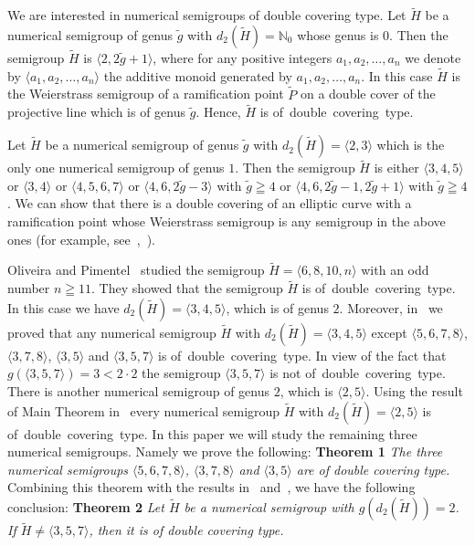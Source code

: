 \documentclass[a4paper,12pt]{article}
\newcommand{\tH}{\tilde{H}}
\newcommand{\tP}{\tilde{P}}
\newcommand{\tg}{\tilde{g}}
\newcommand{\la}{\langle}
\newcommand{\ra}{\rangle}
\newcommand{\NI}{\mathbb{N}_0}
\newcommand{\DC}{\mbox{of double covering type}}
\begin{document}
We are interested in numerical semigroups of double covering type.
Let $\tH$ be a numerical semigroup of genus $\tg$ with $d_2(\tH)=\NI$ whose genus is $0$.
Then the semigroup $\tH$ is  $\la 2,2\tg+1\ra$, where for any positive integers $a_{1},a_{2},\ldots,a_{n}$ we denote by $\langle a_{1},a_{2},\ldots,a_{n}\rangle$ the additive monoid generated by $a_{1},a_{2},\ldots,a_{n}$.
In this case $\tH$ is the Weierstrass semigroup of a ramification point $\tP$ on a double cover of the projective line which is of genus $\tg$.
Hence, $\tH$ is \DC.

Let $\tH$ be a numerical semigroup of genus $\tg$ with $d_2(\tH)=\la 2,3 \ra$ which is the only one numerical semigroup of genus $1$.
Then the semigroup $\tH$ is either $\la 3,4,5\ra$ or $\la 3,4\ra$ or $\la 4,5,6,7\ra$ or $\langle 4,6,2\tg-3\rangle$ with $\tg\geqq 4$ or $\langle 4,6,2\tg-1,2\tg+1\rangle$ with $\tg\geqq 4$.
We can show that there is a double covering of an elliptic curve with a ramification point whose Weierstrass semigroup is any semigroup in the above ones (for example, see~\cite{kom1},~\cite{kom2}).

Oliveira and Pimentel~\cite{oli-pim} studied the semigroup $\tH=\langle 6,8,10,n\rangle$ with an odd number $n\geqq 11$.
They showed that the semigroup $\tH$ is \DC.
In this case we have $d_2(\tH)=\la 3,4,5 \ra$, which is of genus $2$.
Moreover, in~\cite{kom2} we proved that any numerical semigroup $\tH$ with $d_2(\tH)=\la 3,4,5\ra$ except $\la 5,6,7,8 \ra$, $\la 3,7,8 \ra$, $\la 3,5 \ra$ and $\la 3,5,7 \ra$ is \DC.
In view of the fact that $g(\la 3,5,7 \ra)=3<2\cdot 2$ the semigroup $\la 3,5,7 \ra$ is not \DC.
There is another numerical semigroup of genus $2$, which is $\la 2,5 \ra$.
Using the result of Main Theorem in~\cite{kom-ohb} every numerical semigroup $\tH$ with $d_2(\tH)=\la 2,5 \ra$ is \DC.
In this paper we will study the remaining three numerical semigroups.
Namely we prove the following:
\vskip3mm
\noindent
{\bf Theorem 1} {\it The three numerical semigroups $\la 5,6,7,8 \ra$, $\la 3,7,8 \ra$ and $\la 3,5 \ra$ are of double covering type.}
\vskip3mm
Combining this theorem with the results in~\cite{oli-pim} and~\cite{kom2}, we have the following conclusion:
\vskip3mm
\noindent
{\bf Theorem 2} {\it Let $\tH$ be a numerical semigroup with $g(d_2(\tH))=2$.
If $\tH\not=\la 3,5,7\ra$, then it is of double covering type.} 
%
%
\end{document}
